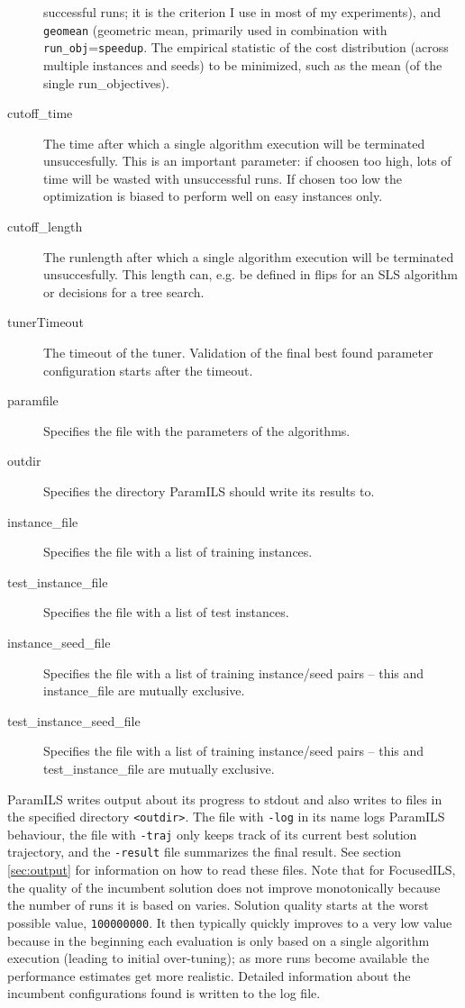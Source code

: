 \documentclass[10pt,letterpaper,twoside]{article}
\begin{document}
\begin{description}
	successful runs; it is the criterion I use in most of my experiments), and \texttt{geomean} (geometric mean, primarily used in combination with \texttt{run\_obj}=\texttt{speedup}.
	The empirical statistic of the cost distribution (across multiple instances and seeds) to be minimized, such as the mean (of the single run\_objectives).
	\item[cutoff\_time] The time after which a single algorithm execution will be terminated unsuccesfully. This is an important parameter: if choosen too high, lots of time will be wasted with unsuccessful runs. If chosen too low the optimization is biased to perform well on easy instances only.
	\item[cutoff\_length] The runlength after which a single algorithm execution will be terminated unsuccesfully. This length can, e.g. be defined in flips for an SLS algorithm or decisions for a tree search.
	\item[tunerTimeout] The timeout of the tuner. Validation of the final best found parameter configuration starts after the timeout.
	\item[paramfile] Specifies the file with the parameters of the algorithms.
	\item[outdir] Specifies the directory ParamILS should write its results to. 
	\item[instance\_file] Specifies the file with a list of training instances.
	\item[test\_instance\_file] Specifies the file with a list of test instances.
	\item[instance\_seed\_file] Specifies the file with a list of training instance/seed pairs -- this and instance\_file are mutually exclusive.
	\item[test\_instance\_seed\_file] Specifies the file with a list of training instance/seed pairs -- this and test\_instance\_file are mutually exclusive.
\end{description}


ParamILS writes output about its progress to stdout and also writes to files in the specified directory \texttt{<outdir>}. 
The file with \texttt{-log} in its name logs ParamILS behaviour, the file with \texttt{-traj} only keeps track 
of its current best solution trajectory, and the \texttt{-result} file summarizes the final result. See section \ref{sec:output} for information on how to read these files.
Note that for FocusedILS, the quality of the incumbent solution does not improve monotonically because the number of runs it is based on
varies. Solution quality starts at the worst possible value, \texttt{100000000}. It then typically quickly improves
to a very low value because in the beginning each evaluation is only based on a single algorithm execution (leading to initial over-tuning); 
as more runs become available the performance estimates get more realistic.
Detailed information about the incumbent configurations found is written to the log file.
\end{document}

